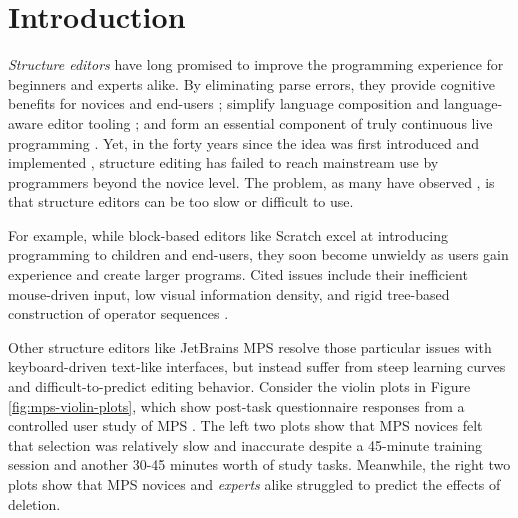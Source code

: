 \section{Introduction}\label{sec:intro}

\emph{Structure editors}
have long promised to improve the programming experience
for beginners and experts alike.
By eliminating parse errors,
they provide cognitive benefits for novices
  \cite{meta-analysis-blocks,blocks-text-high-school,coblox}
  and end-users
  \cite{weitnauer2016graspable,rousillon,BasHermans21};
  simplify language composition
  \cite{mbeddr}
  and language-aware editor tooling
  \cite{HazelnutSNAPL};
  and form an essential component of truly continuous live programming
  \cite{Hazelnut,HazelnutLive}.
Yet, in the forty years since the idea was first
introduced and implemented \cite{Cornell},
structure editing has failed to reach
mainstream use by programmers beyond the novice level.
The problem, as many have observed
\cite{user-modeling,fine-tuning-selection-semantics,
practical-lang-based-editing,lang-on-the-usefulness,
psg,Minor92,TowardUserFriendly,MillerPMV94},
is that structure editors can be too slow
or difficult to use.

For example, while
block-based editors like Scratch \cite{scratch}
excel at introducing programming
to children and end-users, they soon become unwieldy
as users gain experience and create larger programs.
Cited issues include their inefficient mouse-driven
input, low visual information density, and rigid
tree-based construction of operator sequences
\cite{BlocksFingertips,cog-dim-blocks,blocks-and-beyond}.

Other structure editors like JetBrains MPS
\cite{DBLP:conf/icse/VoelterP12}
resolve those particular issues with
keyboard-driven text-like interfaces, but instead suffer
from steep learning curves and difficult-to-predict
editing behavior.
Consider the violin plots in Figure \ref{fig:mps-violin-plots},
which show post-task questionnaire responses from
a controlled user study of MPS \cite{ProjEfficiency}.
The left two plots show that MPS novices felt that
selection was relatively slow and inaccurate despite
a 45-minute training session and another 30-45 minutes
worth of study tasks.
Meanwhile, the right two plots show that
MPS novices and \emph{experts} alike struggled to
predict the effects of deletion.

